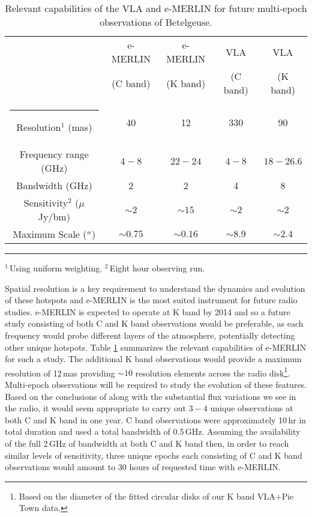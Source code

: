 \begin{table}[hb]
\begin{center}
\caption[Relevant Capabilities of the VLA and e-MERLIN]{Relevant capabilities of the VLA and e-MERLIN for future multi-epoch observations of Betelgeuse.}
\begin{tabular}{ccccc}
\hline
\hline
\rule{0pt}{2.5ex}  & e-MERLIN  & e-MERLIN & VLA  & VLA \\
\rule{0pt}{2.5ex}  & (C band) & (K band) & (C band) & (K band)\\
\hline
\rule{-2.5pt}{2.5ex}	Resolution$^{1}$ (mas) &  40 & 12 & 330&90\\
					Frequency range (GHz) &  $4-8$ & $22-24$ & $4-8$&$18-26.6$\\
					Bandwidth (GHz) &  2& 2 & 4&8\\
					Sensitivity$^{2}$ ($\mu$ Jy/bm) & $\sim 2$ & $\sim 15$&$\sim 2$&$\sim 2$\\
					Maximum Scale ($^{\prime\prime}$) & $\sim 0.75$ & $\sim 0.16$&$\sim 8.9$&$\sim 2.4$\\
\hline
\end{tabular}
\label{tab:8.1}
\begin{minipage}{12.5cm}
\rule{-2.5pt}{2.5ex}{\footnotesize $^{1}$\,Using uniform weighting. $^{2}$\,Eight hour observing run.}
\end{minipage}
\end{center}
\end{table}

Spatial resolution is a key requirement to understand the dynamics and evolution of these hotspots and e-MERLIN is the most suited instrument for future radio studies. e-MERLIN is expected to operate at K band by 2014 and so a future study consisting of both C and K band observations would be preferable, as each frequency would probe different layers of the atmosphere, potentially detecting other unique hotspots. Table \ref{tab:8.1} summarizes the relevant capabilities of e-MERLIN for such a study. The additional K band observations would provide a maximum resolution of 12\,mas providing $\sim 10$ resolution elements across the radio disk\footnote{Based on the diameter of the fitted circular disks of our K band VLA+Pie Town data.}. Multi-epoch observations will be required to study the evolution of these features. Based on the conclusions of \cite{ohnaka_2011} along with the substantial flux variations we see in the radio, it would seem appropriate to carry out $3-4$ unique observations at both C and K band in one year. \cite{richards_2013}  C band observations were approximately 10\,hr in total duration and used a total bandwidth of 0.5\,GHz. Assuming the availability of the full 2\,GHz of bandwidth at both C and K band then, in order to reach similar levels of sensitivity, three unique epochs each consisting of C and K band observations would amount to 30 hours of requested time with e-MERLIN.


